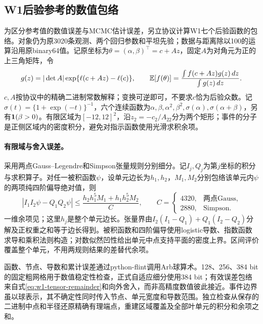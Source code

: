 \subsection{W1后验参考的数值包络}
\label{sec:w1-enclosure-method}
为区分参考值的数值误差与MCMC估计误差，另立协议计算W1七个后验函数的包络。对象仍为原3020条观测、两个回归参数和平坦先验；数据与距离除以100的运算沿用原binary64值。记原坐标为$\theta=(\alpha,\beta)^\top=c+Az$，固定$A$为对角元为正的上三角矩阵，令
\[
g(z)=|\det A|\exp\{\ell(c+Az)-\ell(c)\},\qquad
\mathbb{E}[f(\theta)]=\frac{\int f(c+Az)g(z)\,dz}{\int g(z)\,dz}.
\]
$c,A$按协议中的精确二进制常数解释；变换可逆即可，不要求$c$恰为后验众数。记$\sigma(t)=\{1+\exp(-t)\}^{-1}$，六个连续函数为$\alpha,\beta,\alpha^2,\beta^2,\sigma(\alpha),\sigma(\alpha+\beta)$，另有$\mathbf{1}(\beta>0)$。有限区域为$[-12,12]^2$，沿$z_2=-c_2/A_{22}$分为两个矩形；事件的分子是正侧区域内的密度积分，避免对指示函数使用光滑求积余项。

\paragraph{有限域与舍入误差。}
采用两点Gauss--Legendre和Simpson张量规则分别细分。记$I_j,Q_j$为第$j$坐标的积分与求积算子。对任一被积函数$\psi$，设单元边长为$h_1,h_2$，$M_1,M_2$分别包络该单元内$\psi$的两项纯四阶偏导绝对值，则
\begin{equation}
|I_1I_2 \psi-Q_1Q_2 \psi|
\leq\frac{h_2h_1^5M_1+h_1h_2^5M_2}{C},\qquad
C=\begin{cases}4320,&\text{两点Gauss},\\2880,&\text{Simpson}.\end{cases}
\label{eq:w1-tensor-remainder}
\end{equation}
一维余项见\cite{dlmfquadrature}；这里$h_j$是整个单元边长。张量界由$I_2(I_1-Q_1)+Q_1(I_2-Q_2)$分解及正权重之和等于边长得到。被积函数和四阶偏导使用logistic导数、指数函数求导和乘积法则构造；对数似然凹性给出单元中点支持平面的密度上界。区间评价覆盖整个单元，不用两规则结果的差替代余项。

函数、节点、导数和累计误差通过python-flint调用Arb球算术\cite{arb}。128、256、384 bit的固定粗网格用于数值稳定性检查，正式自适应细分使用384 bit；有效误差包络来自式\eqref{eq:w1-tensor-remainder}和向外舍入，而非高精度数值彼此接近。事件边界虽以球表示，其不确定性同时传入节点、单元宽度和导数范围。独立检查从保存的二进制中点和半径还原精确有理端点，重建区域覆盖及全部叶单元的积分和余项之和。

